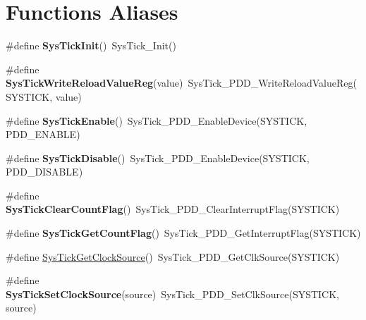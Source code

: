\hypertarget{group___func_ala}{\section{Functions Aliases}
\label{group___func_ala}
}
\begin{DoxyCompactItemize}
\item 
\hypertarget{group___func_ala_ga3b66903e53d4c3ee8d6dd35a735d5044}{\#define {\bfseries Sys\-Tick\-Init}()~Sys\-Tick\-\_\-\-Init()}\label{group___func_ala_ga3b66903e53d4c3ee8d6dd35a735d5044}

\item 
\hypertarget{group___func_ala_gaef0457d2809910ef69ec3b2c9ae5b872}{\#define {\bfseries Sys\-Tick\-Write\-Reload\-Value\-Reg}(value)~Sys\-Tick\-\_\-\-P\-D\-D\-\_\-\-Write\-Reload\-Value\-Reg(S\-Y\-S\-T\-I\-C\-K, value)}\label{group___func_ala_gaef0457d2809910ef69ec3b2c9ae5b872}

\item 
\hypertarget{group___func_ala_ga2fc83d523bb32ef6d535cb44dcf9ac7a}{\#define {\bfseries Sys\-Tick\-Enable}()~Sys\-Tick\-\_\-\-P\-D\-D\-\_\-\-Enable\-Device(S\-Y\-S\-T\-I\-C\-K, P\-D\-D\-\_\-\-E\-N\-A\-B\-L\-E)}\label{group___func_ala_ga2fc83d523bb32ef6d535cb44dcf9ac7a}

\item 
\hypertarget{group___func_ala_ga74ea2fdb887e7cf164ee8862a1eec372}{\#define {\bfseries Sys\-Tick\-Disable}()~Sys\-Tick\-\_\-\-P\-D\-D\-\_\-\-Enable\-Device(S\-Y\-S\-T\-I\-C\-K, P\-D\-D\-\_\-\-D\-I\-S\-A\-B\-L\-E)}\label{group___func_ala_ga74ea2fdb887e7cf164ee8862a1eec372}

\item 
\hypertarget{group___func_ala_gab742e2e69aadbbce8a01b23c0e079586}{\#define {\bfseries Sys\-Tick\-Clear\-Count\-Flag}()~Sys\-Tick\-\_\-\-P\-D\-D\-\_\-\-Clear\-Interrupt\-Flag(S\-Y\-S\-T\-I\-C\-K)}\label{group___func_ala_gab742e2e69aadbbce8a01b23c0e079586}

\item 
\hypertarget{group___func_ala_gace1fb7f95bccadadf7f1b2d7ed9f693b}{\#define {\bfseries Sys\-Tick\-Get\-Count\-Flag}()~Sys\-Tick\-\_\-\-P\-D\-D\-\_\-\-Get\-Interrupt\-Flag(S\-Y\-S\-T\-I\-C\-K)}\label{group___func_ala_gace1fb7f95bccadadf7f1b2d7ed9f693b}

\item 
\#define \hyperlink{group___func_ala_ga6f018cace975daf564c74095e346bba6}{Sys\-Tick\-Get\-Clock\-Source}()~Sys\-Tick\-\_\-\-P\-D\-D\-\_\-\-Get\-Clk\-Source(S\-Y\-S\-T\-I\-C\-K)
\item 
\hypertarget{group___func_ala_gadaebb500769c22e92dda06e9a76a0f9f}{\#define {\bfseries Sys\-Tick\-Set\-Clock\-Source}(source)~Sys\-Tick\-\_\-\-P\-D\-D\-\_\-\-Set\-Clk\-Source(S\-Y\-S\-T\-I\-C\-K, source)}\label{group___func_ala_gadaebb500769c22e92dda06e9a76a0f9f}

\end{DoxyCompactItemize}
